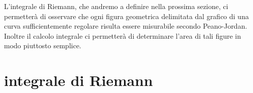 % 
% 
% 

L'integrale di Riemann, che andremo a definire
nella prossima sezione, ci permetterà di osservare che ogni figura geometrica
delimitata dal grafico di una curva sufficientemente regolare risulta
essere misurabile secondo Peano-Jordan. 
Inoltre il calcolo integrale ci permetterà
di determinare l'area di tali figure in modo piuttosto semplice.

\section{integrale di Riemann}

